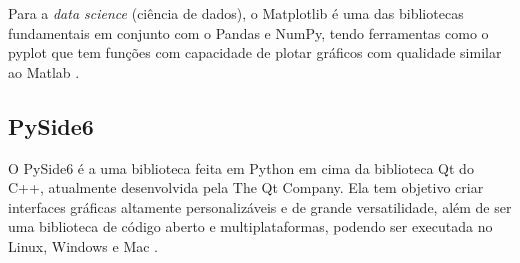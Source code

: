 Para a \textit{data science} (ciência de dados), o Matplotlib é uma das bibliotecas fundamentais em conjunto com o Pandas e NumPy, tendo ferramentas como o pyplot que tem funções com capacidade de plotar gráficos com qualidade similar ao Matlab \cite{ref:bisong_2019}.

\subsection{PySide6}

O PySide6 é a uma biblioteca feita em Python em cima da biblioteca Qt do C++, atualmente desenvolvida pela The Qt Company. Ela tem objetivo criar interfaces gráficas altamente personalizáveis e de grande versatilidade, além de ser uma biblioteca de código aberto e multiplataformas, podendo ser executada no Linux, Windows e Mac \cite{ref:fitzpatrick_2022}.
